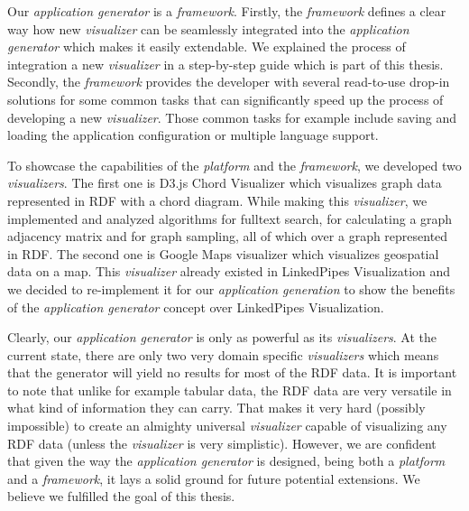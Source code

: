 Our \emph{application generator} is a \emph{framework}. Firstly, the \emph{framework} defines a clear way how new \emph{visualizer} can be seamlessly integrated into the \emph{application generator} which makes it easily extendable. We explained the process of integration a new \emph{visualizer} in a step-by-step guide which is part of this thesis. Secondly, the \emph{framework} provides the developer with several read-to-use drop-in solutions for some common tasks that can significantly speed up the process of developing a new \emph{visualizer}. Those common tasks for example include saving and loading the application configuration or multiple language support.

To showcase the capabilities of the \emph{platform} and the \emph{framework}, we developed two \emph{visualizers}. The first one is D3.js Chord Visualizer which visualizes graph data represented in RDF with a chord diagram. While making this \emph{visualizer}, we implemented and analyzed algorithms for fulltext search, for calculating a graph adjacency matrix and for graph sampling, all of which over a graph represented in RDF. The second one is Google Maps visualizer which visualizes geospatial data on a map. This \emph{visualizer} already existed in LinkedPipes Visualization and we decided to re-implement it for our \emph{application generation} to show the benefits of the \emph{application generator} concept over LinkedPipes Visualization.

Clearly, our \emph{application generator} is only as powerful as its \emph{visualizers}. At the current state, there are only two very domain specific \emph{visualizers} which means that the generator will yield no results for most of the RDF data. It is important to note that unlike for example tabular data, the RDF data are very versatile in what kind of information they can carry. That makes it very hard (possibly impossible) to create an almighty universal \emph{visualizer} capable of visualizing any RDF data (unless the \emph{visualizer} is very simplistic). However, we are confident that given the way the \emph{application generator} is designed, being both a \emph{platform} and a \emph{framework}, it lays a solid ground for future potential extensions. We believe we fulfilled the goal of this thesis.

